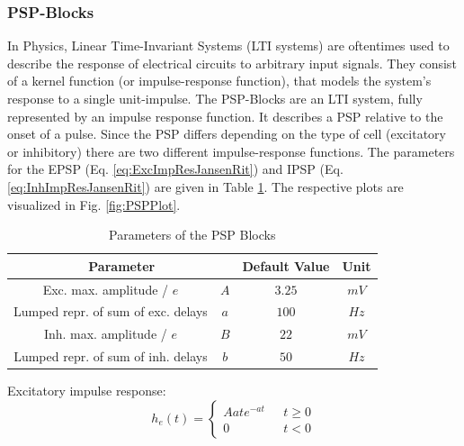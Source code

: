 \subsubsection{PSP-Blocks}
In Physics, Linear Time-Invariant Systems (LTI systems) are oftentimes used to describe the response of electrical circuits to arbitrary input signals. They consist of a kernel function (or impulse-response function), that models the system's response to a single unit-impulse.
The PSP-Blocks are an LTI system, fully represented by an impulse response function. It describes a PSP relative to the onset of a pulse. Since the PSP differs depending on the type of cell (excitatory or inhibitory) there are two different impulse-response functions. The parameters for the EPSP (Eq. \ref{eq:ExcImpResJansenRit}) and IPSP (Eq. \ref{eq:InhImpResJansenRit}) are given in Table \ref{table:psp_params}. The respective plots are visualized in Fig. \ref{fig:PSPPlot}.
\begin{table}[H]
    \centering
    \begin{tabular}{ |c|c|c|c| }
        \hline
        \multicolumn{2}{|c|}{Parameter} & Default Value & Unit \\
        \hline
        \hline
        Exc. max. amplitude / $e$          & \(A\) & \(3.25\) & \(mV\) \\
        \hline
        Lumped repr. of sum of exc. delays & \(a\) & \(100\)  & \(Hz\) \\
        \hline
        Inh. max. amplitude / $e$          & \(B\) & \(22\)   & \(mV\) \\
        \hline
        Lumped repr. of sum of inh. delays & \(b\) & \(50\)   & \(Hz\) \\
        \hline
    \end{tabular}
    \caption{Parameters of the PSP Blocks}
    \label{table:psp_params}
\end{table}

Excitatory impulse response:
\begin{equation}
    h_e(t) = \begin{cases}
                 Aate^{-at} & \mbox{ } t \geq 0 \\
                 0 & \mbox{ } t < 0
    \end{cases} \label{eq:ExcImpResJansenRit}
\end{equation}

